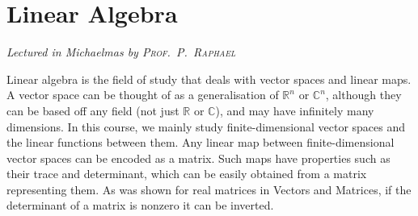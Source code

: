 \chapter[Linear Algebra \\ \textnormal{\emph{Lectured in Michaelmas \oldstylenums{2021} by \textsc{Prof.\ P.\ Raphael}}}]{Linear Algebra}
\emph{\Large Lectured in Michaelmas  by \textsc{Prof.\ P.\ Raphael}}

Linear algebra is the field of study that deals with vector spaces and linear maps.
A vector space can be thought of as a generalisation of \( \mathbb R^n \) or \( \mathbb C^n \), although they can be based off any field (not just \( \mathbb R \) or \( \mathbb C \)), and may have infinitely many dimensions.
In this course, we mainly study finite-dimensional vector spaces and the linear functions between them.
Any linear map between finite-dimensional vector spaces can be encoded as a matrix.
Such maps have properties such as their trace and determinant, which can be easily obtained from a matrix representing them.
As was shown for real matrices in Vectors and Matrices, if the determinant of a matrix is nonzero it can be inverted.


